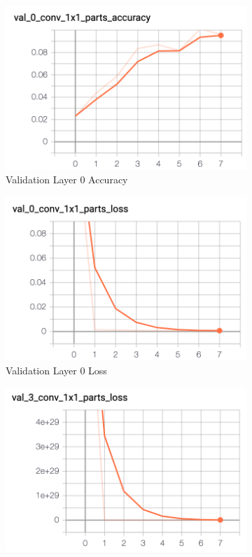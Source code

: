 \documentclass[11pt, letterpaper]{article}
\begin{document}
\begin{figure}[h]
    \centering
    \begin{subfigure}{0.4\textwidth}
        \centering
        \includegraphics[width=0.8\linewidth]{val_layer_0_acc.png}
        \caption{Validation Layer 0 Accuracy}
    \end{subfigure}
    \begin{subfigure}{0.4\textwidth}
        \centering
        \includegraphics[width=0.8\linewidth]{val_layer_0_loss.png}
        \caption{Validation Layer 0 Loss}
    \end{subfigure}
    \begin{subfigure}{0.4\textwidth}
        \centering
        \includegraphics[width=0.8\linewidth]{val_layer_3_acc.png}

\end{subfigure}
\end{figure}
\end{document}
